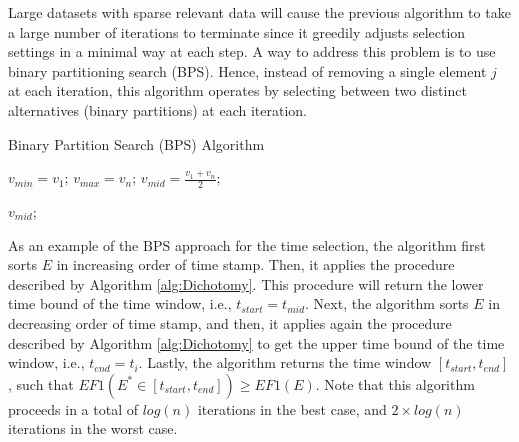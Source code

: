  Large datasets with sparse relevant data will cause the previous algorithm to take a large number of iterations to terminate since it greedily adjusts selection settings in a minimal way at each step.  A way to address this problem is to use binary partitioning search (BPS).  Hence, instead of removing a single element $j$ at each iteration, this algorithm operates by selecting between two distinct alternatives (binary partitions) at each iteration. 

\begin{algorithm}[t]
\caption{Binary Partition Search (BPS) Algorithm}
\SetAlgoLined
{}
\BlankLine
\label{alg:Dichotomy}

$v_{min}=v_1$; $v_{max}=v_n$;  $v_{mid}=\tfrac{v_1+v_n}{2}$;

\Return  $v_{mid}$;

\label{alg:return}
\end{algorithm} 




As an example of the BPS approach for the time selection, the algorithm first sorts $E$ in increasing order of time stamp. Then, it applies the procedure described by Algorithm \ref{alg:Dichotomy}. This procedure will return  the lower time bound of the time window, i.e., $t_{start}=t_{mid}$.
Next, the algorithm sorts $E$ in decreasing order of time stamp, and then, it applies again the procedure described by Algorithm \ref{alg:Dichotomy} to get the upper time bound of the time window, i.e., $t_{end}=t_i$. Lastly, the algorithm returns the  time window $[t_{start},t_{end}]$, such that $EF1(E^{*} \in [t_{start},t_{end}]) \geq EF1(E)$. Note that this algorithm proceeds in a total of $log(n)$ iterations in the best case, and $2\times log(n)$ iterations in the worst case.

